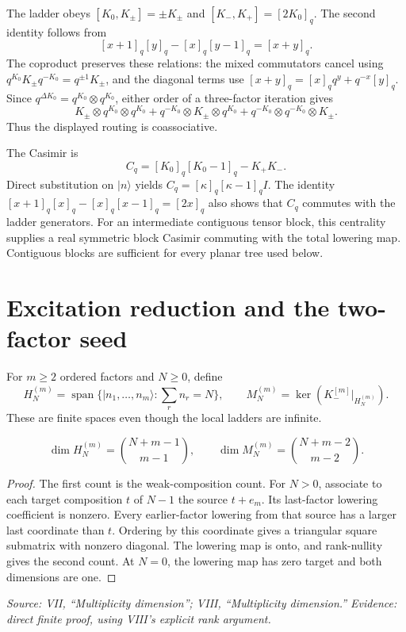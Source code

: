 The ladder obeys $[K_0,K_\pm]=\pm K_\pm$ and $[K_-,K_+]=[2K_0]_q$. The second identity follows from
\[
[x+1]_q[y]_q-[x]_q[y-1]_q=[x+y]_q.
\]
The coproduct preserves these relations: the mixed commutators cancel using $q^{K_0}K_\pm q^{-K_0}=q^{\pm1}K_\pm$, and the diagonal terms use $[x+y]_q=[x]_q q^y+q^{-x}[y]_q$. Since $q^{\Delta K_0}=q^{K_0}\otimes q^{K_0}$, either order of a three-factor iteration gives
\[
K_\pm\otimes q^{K_0}\otimes q^{K_0}
+q^{-K_0}\otimes K_\pm\otimes q^{K_0}
+q^{-K_0}\otimes q^{-K_0}\otimes K_\pm.
\]
Thus the displayed routing is coassociative.

The Casimir is
\[
C_q=[K_0]_q[K_0-1]_q-K_+K_-.
\]
Direct substitution on $|n\rangle$ yields $C_q=[\kappa]_q[\kappa-1]_q I$. The identity $[x+1]_q[x]_q-[x]_q[x-1]_q=[2x]_q$ also shows that $C_q$ commutes with the ladder generators. For an intermediate contiguous tensor block, this centrality supplies a real symmetric block Casimir commuting with the total lowering map. Contiguous blocks are sufficient for every planar tree used below.

\section{Excitation reduction and the two-factor seed}

For $m\geq2$ ordered factors and $N\geq0$, define
\[
H_N^{(m)}=\operatorname{span}\{|n_1,\ldots,n_m\rangle:\textstyle\sum_r n_r=N\},
\qquad
M_N^{(m)}=\ker(K_-^{[m]}|_{H_N^{(m)}}).
\]
These are finite spaces even though the local ladders are infinite.

\begin{proposition}
\[
\dim H_N^{(m)}=\binom{N+m-1}{m-1},
\qquad
\dim M_N^{(m)}=\binom{N+m-2}{m-2}.
\]
\end{proposition}

\begin{proof}
The first count is the weak-composition count. For $N>0$, associate to each target composition $t$ of $N-1$ the source $t+e_m$. Its last-factor lowering coefficient is nonzero. Every earlier-factor lowering from that source has a larger last coordinate than $t$. Ordering by this coordinate gives a triangular square submatrix with nonzero diagonal. The lowering map is onto, and rank-nullity gives the second count. At $N=0$, the lowering map has zero target and both dimensions are one.
\end{proof}

\noindent\emph{Source: VII, ``Multiplicity dimension''; VIII, ``Multiplicity dimension.'' Evidence: direct finite proof, using VIII's explicit rank argument.}

